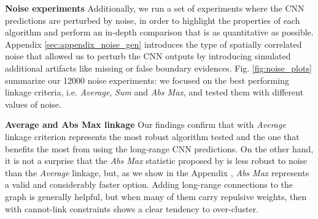 

\textbf{Noise experiments }  Additionally, we run a set of experiments where the CNN predictions are perturbed by noise, in order to highlight the properties of each \algname{} algorithm and perform an in-depth comparison that is as quantitative as possible. Appendix \ref{sec:appendix_noise_gen} introduces the type of spatially correlated noise that allowed us to perturb the CNN outputs by introducing simulated additional artifacts like missing or false boundary evidences.  
Fig. \ref{fig:noise_plots} summarize our 12000 noise experiments: we focused on the best performing linkage criteria, i.e. \emph{Average}, \emph{Sum} and \emph{Abs Max}, and tested them with different values of noise. %

\textbf{Average and Abs Max linkage } Our findings confirm that \algname{} with \emph{Average} linkage criterion represents the most robust algorithm tested and the one that benefits the most from using the long-range CNN predictions. On the other hand, it is not a surprise that the \emph{Abs Max} statistic proposed by \cite{wolf2018mutex} is less robust to noise than the \emph{Average} linkage, but, as we show in the Appendix , \emph{Abs Max} represents a valid and considerably faster option. 
Adding long-range connections to the graph is generally helpful, but when many of them carry repulsive weights, then \algname{} with cannot-link constraints shows a clear tendency to over-cluster.    

